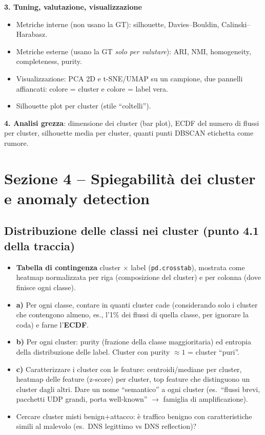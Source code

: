 \begin{strategia}
\textbf{3. Tuning, valutazione, visualizzazione}
\begin{itemize}
  \item Metriche interne (non usano la GT): silhouette, Davies--Bouldin,
        Calinski--Harabasz.
  \item Metriche esterne (usano la GT \emph{solo per valutare}): ARI, NMI,
        homogeneity, completeness, purity.
  \item Visualizzazione: PCA 2D e t-SNE/UMAP su un campione, due pannelli
        affiancati: colore = cluster e colore = label vera.
  \item Silhouette plot per cluster (stile ``coltelli'').
\end{itemize}

\textbf{4. Analisi grezza}: dimensione dei cluster (bar plot), ECDF del
numero di flussi per cluster, silhouette media per cluster, quanti punti
DBSCAN etichetta come rumore.
\end{strategia}

\section{Sezione 4 -- Spiegabilità dei cluster e anomaly detection}

\subsection{Distribuzione delle classi nei cluster (punto 4.1 della traccia)}
\begin{strategia}
\begin{itemize}
  \item \textbf{Tabella di contingenza} cluster $\times$ label
        (\texttt{pd.crosstab}), mostrata come heatmap normalizzata per riga
        (composizione del cluster) e per colonna (dove finisce ogni classe).
  \item \textbf{a)} Per ogni classe, contare in quanti cluster cade
        (considerando solo i cluster che contengono almeno, es., l'1\% dei
        flussi di quella classe, per ignorare la coda) e farne l'\textbf{ECDF}.
  \item \textbf{b)} Per ogni cluster: purity (frazione della classe
        maggioritaria) ed entropia della distribuzione delle label. Cluster
        con purity $\approx1$ = cluster ``puri''.
  \item \textbf{c)} Caratterizzare i cluster con le feature: centroidi/mediane
        per cluster, heatmap delle feature (z-score) per cluster, top feature
        che distinguono un cluster dagli altri. Dare un nome ``semantico'' a
        ogni cluster (es.\ ``flussi brevi, pacchetti UDP grandi, porta
        well-known'' $\rightarrow$ famiglia di amplificazione).
  \item Cercare cluster misti benign+attacco: è traffico benigno con
        caratteristiche simili al malevolo (es.\ DNS legittimo vs DNS
        reflection)?
\end{itemize}
\end{strategia}

